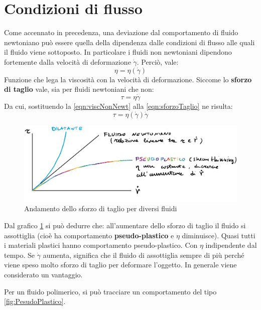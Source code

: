\section{Condizioni di flusso}
Come accennato in precedenza, una deviazione dal comportamento di fluido newtoniano può essere quella della dipendenza dalle condizioni di flusso alle quali il fluido viene sottoposto.
In particolare i fluidi non newtoniani dipendono fortemente dalla velocità di deformazione $\dot{\gamma}$.
Perciò, vale:
\begin{equation}
\eta = \eta(\dot{\gamma})
\label{eqn:viscNonNewt}
\end{equation}
Funzione che lega la viscosità con la velocità di deformazione.
Siccome lo \textbf{sforzo di taglio} vale, sia per fluidi newtoniani che non:
\begin{equation}
\tau = \eta \dot{\gamma}
\label{eqn:sforzoTaglio}
\end{equation}
Da cui, sostituendo la \eqref{eqn:viscNonNewt} alla \eqref{eqn:sforzoTaglio} ne risulta:
\begin{equation}
\tau = \eta(\dot{\gamma}) \dot{\gamma}
\label{eqn:taglioNonNewt}
\end{equation}

\begin{figure}
\centering
\includegraphics[width = \textwidth]{gfx/TaglioNonNewt}
\caption{Andamento dello sforzo di taglio per diversi fluidi}
\label{fig:TaglioNonNewt}
\end{figure}

Dal grafico \ref{fig:TaglioNonNewt} si può dedurre che:
all'aumentare dello sforzo di taglio il fluido si assottiglia (cioè ha comportamento \textbf{pseudo-plastico} e $\eta$ diminuisce).
Quasi tutti i materiali plastici hanno comportamento pseudo-plastico. Con $\eta$ indipendente dal tempo.
Se $\dot{\gamma}$ aumenta, significa che il fluido di assottiglia sempre di più perché viene speso molto sforzo di taglio per deformare l'oggetto. In generale viene considerato un vantaggio.

Per un fluido polimerico, si può tracciare un comportamento del tipo \ref{fig:PesudoPlastico}.

